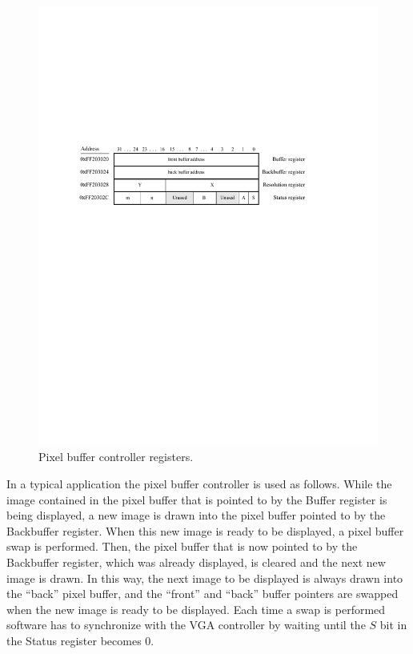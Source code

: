 \documentclass[epsfig,10pt,fullpage]{article}
\begin{document}
\begin{figure}[h!]
   \begin{center}
       \includegraphics{figures/fig_video_port.pdf}
   \end{center}
   \caption{Pixel buffer controller registers.}
	\label{fig:pixel_ctrl}
\end{figure}


In a typical application the pixel buffer controller is used as follows. While the image
contained in the pixel buffer that is pointed to by the Buffer register is being displayed, 
a new image is drawn into the pixel buffer pointed to by the Backbuffer register. When this new
image is ready to be displayed, a pixel buffer swap is performed. Then, the pixel buffer 
that is now pointed to by the Backbuffer register, which was already displayed, is cleared and 
the next new image is drawn. In this way, the next image to be displayed is always drawn into
the ``back'' pixel buffer, and the ``front'' and ``back'' buffer pointers are swapped when 
the new image is ready to be displayed. Each time a swap is performed software has to 
synchronize with the VGA controller by waiting until the $S$ bit in the Status register becomes 0.
\end{document}
